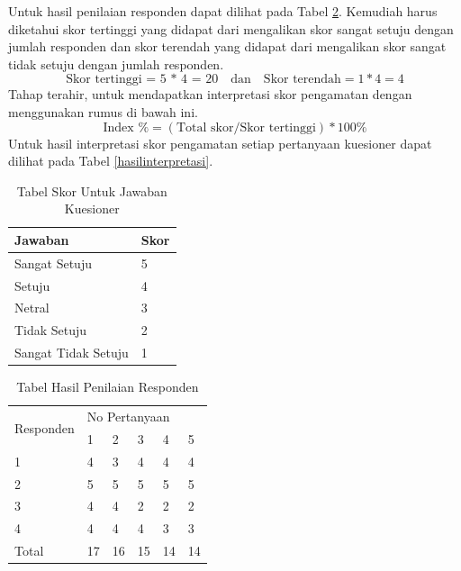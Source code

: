 Untuk hasil penilaian responden dapat dilihat pada Tabel \ref{hasilpenilaian}. Kemudiah harus diketahui skor tertinggi yang didapat dari mengalikan skor sangat setuju dengan jumlah responden dan skor terendah yang didapat dari mengalikan skor sangat tidak setuju dengan jumlah responden. $$\textrm{Skor tertinggi = 5 * 4 = 20} \quad \textrm{dan} \quad \textrm{Skor terendah} = 1 * 4 = 4$$ Tahap terahir, untuk mendapatkan interpretasi skor pengamatan dengan menggunakan rumus di bawah ini. $$\textrm{Index \%} = (\textrm{Total skor} / \textrm{Skor tertinggi}) * 100\%$$ Untuk hasil interpretasi skor pengamatan setiap pertanyaan kuesioner dapat dilihat pada Tabel \ref{hasilinterpretasi}.

\begin{table}[H]
\centering
\caption{Tabel Skor Untuk Jawaban Kuesioner}
\label{skorkuesioner}
\begin{tabular}{|l|l|}
\hline
Jawaban & Skor \\ \hline
Sangat Setuju & 5 \\ \hline
Setuju & 4 \\ \hline
Netral & 3 \\ \hline
Tidak Setuju & 2 \\ \hline
Sangat Tidak Setuju & 1 \\ \hline
\end{tabular}
\end{table}

\begin{table}[H]
\centering
\caption{Tabel Hasil Penilaian Responden}
\label{hasilpenilaian}
\begin{tabular}{|l|l|l|l|l|l|}
\hline
\multirow{2}{*}{Responden} & \multicolumn{5}{l|}{No Pertanyaan} \\ \cline{2-6} 
                           & 1     & 2     & 3    & 4    & 5    \\ \hline
1                          & 4     & 3     & 4    & 4    & 4    \\ \hline
2                          & 5     & 5     & 5    & 5    & 5    \\ \hline
3                          & 4     & 4     & 2    & 2    & 2    \\ \hline
4                          & 4     & 4     & 4    & 3    & 3    \\ \hline
Total                      & 17    & 16    & 15   & 14   & 14   \\ \hline
\end{tabular}
\end{table}

